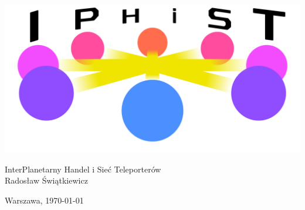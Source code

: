\begin{titlepage}
\pagestyle{empty}

\vfill
\begin{center}
\includegraphics[width=\textwidth]{img/logo.pdf}
\end{center}

\begin{center}
\Large
InterPlanetarny Handel i Sieć Teleporterów \\
\large
Radosław Świątkiewicz
\end{center}


\vfill
\begin{center}
Warszawa, \today
\end{center}

\end{titlepage} 

